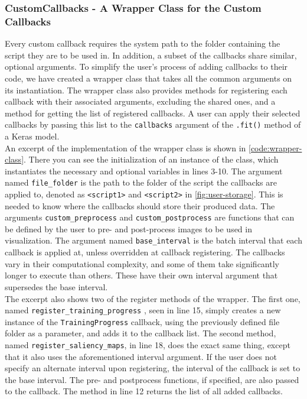 \subsubsection{CustomCallbacks - A Wrapper Class for the Custom Callbacks}

Every custom callback requires the system path to the folder containing the script they are to be used in. In addition, a subset of the callbacks share similar, optional arguments. To simplify the user's process of adding callbacks to their code, we have created a wrapper class that takes all the common arguments on its instantiation. The wrapper class also provides methods for registering each callback with their associated arguments, excluding the shared ones, and a method for getting the list of registered callbacks. A user can apply their selected callbacks by passing this list to the \texttt{callbacks} argument of the \texttt{.fit()} method of a Keras model.\\

\noindent An excerpt of the implementation of the wrapper class is shown in \autoref{code:wrapper-class}. There you can see the initialization of an instance of the class, which instantiates the necessary and optional variables in lines 3-10. The argument named \texttt{file\_folder} is the path to the folder of the script the callbacks are applied to, denoted as \texttt{<script1>} and \texttt{<script2>} in \autoref{fig:user-storage}. This is needed to know where the callbacks should store their produced data. The arguments \texttt{custom\_preprocess} and \texttt{custom\_postprocess} are functions that can be defined by the user to pre- and post-process images to be used in visualization. The argument named \texttt{base\_interval} is the batch interval that each callback is applied at, unless overridden at callback registering. The callbacks vary in their computational complexity, and some of them take significantly longer to execute than others. These have their own interval argument that supersedes the base interval. \\

\noindent The excerpt also shows two of the register methods of the wrapper. The first one, named \texttt{register\_training\_progress} , seen in line 15, simply creates a new instance of the \texttt{TrainingProgress} callback, using the previously defined file folder as a parameter, and adds it to the callback list. The second method, named \texttt{register\_saliency\_maps}, in line 18, does the exact same thing, except that it also uses the aforementioned interval argument. If the user does not specify an alternate interval upon registering, the interval of the callback is set to the base interval. The pre- and postprocess functions, if specified, are also passed to the callback. The method in line 12 returns the list of all added callbacks.

